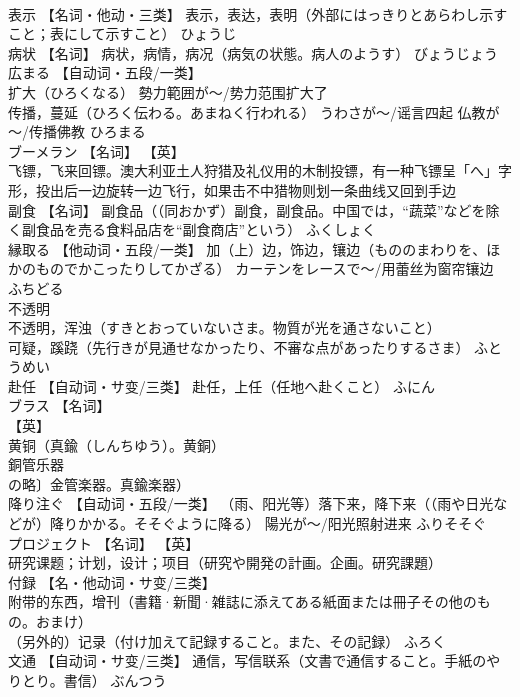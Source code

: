 \documentclass[8pt]{extreport}
\begin{document}
\begin{CJK}{UTF8}{min}
\\	表示	【名词・他动・三类】 表示，表达，表明（外部にはっきりとあらわし示すこと；表にして示すこと）	ひょうじ	
\\	病状	【名词】 病状，病情，病况（病気の状態。病人のようす）	びょうじょう	
\\	広まる	【自动词・五段/一类】 
\\	扩大（ひろくなる） 勢力範囲が～/势力范围扩大了 
\\	传播，蔓延（ひろく伝わる。あまねく行われる） うわさが～/谣言四起 仏教が～/传播佛教	ひろまる	
\\	ブーメラン	【名词】 【英】
\\	飞镖，飞来回镖。澳大利亚土人狩猎及礼仪用的木制投镖，有一种飞镖呈「へ」字形，投出后一边旋转一边飞行，如果击不中猎物则划一条曲线又回到手边		
\\	副食	【名词】 副食品（（同おかず）副食，副食品。中国では，“蔬菜”などを除く副食品を売る食料品店を“副食商店”という）	ふくしょく	
\\	縁取る	【他动词・五段/一类】 加（上）边，饰边，镶边（もののまわりを、ほかのものでかこったりしてかざる） カーテンをレースで～/用蕾丝为窗帘镶边	ふちどる	
\\	不透明	
\\	不透明，浑浊（すきとおっていないさま。物質が光を通さないこと） 
\\	可疑，蹊跷（先行きが見通せなかったり、不審な点があったりするさま）	ふとうめい	
\\	赴任	【自动词・サ变/三类】 赴任，上任（任地へ赴くこと）	ふにん	
\\	ブラス	【名词】 
\\	【英】
\\	黄铜（真鍮（しんちゆう）。黄銅） 
\\	銅管乐器
\\	の略〕金管楽器。真鍮楽器）		
\\	降り注ぐ	【自动词・五段/一类】 （雨、阳光等）落下来，降下来（（雨や日光などが）降りかかる。そそぐように降る） 陽光が～/阳光照射进来	ふりそそぐ	
\\	プロジェクト	【名词】 【英】
\\	研究课题；计划，设计；项目（研究や開発の計画。企画。研究課題）		
\\	付録	【名・他动词・サ变/三类】 
\\	附带的东西，增刊（書籍·新聞·雑誌に添えてある紙面または冊子その他のもの。おまけ） 
\\	（另外的）记录（付け加えて記録すること。また、その記録）	ふろく	
\\	文通	【自动词・サ变/三类】 通信，写信联系（文書で通信すること。手紙のやりとり。書信）	ぶんつう	

\end{CJK}
\end{document}
